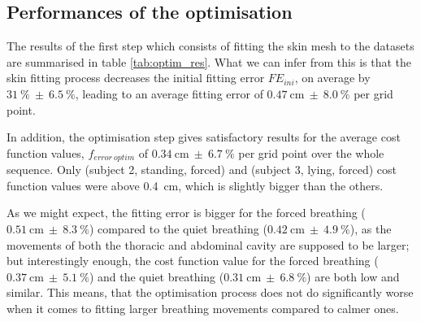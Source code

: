 \subsection{Performances of the optimisation}
The results of the first step which consists of fitting the skin mesh to the datasets are summarised in table \ref{tab:optim_res}. What we can infer from this is that the skin fitting process decreases the initial fitting error $FE_{ini}$, on average by $31~\%~\pm~6.5~\%$, leading to an average fitting error of $0.47~\mathrm{cm}~\pm~8.0~\%$ per grid point. 

In addition, the optimisation step gives satisfactory results for the average cost function values, $f_{error~optim}$ of $0.34~\mathrm{cm}~\pm~6.7~\%$ per grid point over the whole sequence. Only (subject 2, standing, forced) and (subject 3, lying, forced) cost function values were above 0.4~cm, which is slightly bigger than the others.
 
As we might expect, the fitting error is bigger for the forced breathing ($0.51~\mathrm{cm}~\pm~8.3~\%$) compared to the quiet breathing ($0.42~\mathrm{cm}~\pm~4.9~\%$), as the movements of both the thoracic and abdominal cavity are supposed to be larger; but interestingly enough, the cost function value for the forced breathing ($0.37~\mathrm{cm}~\pm~5.1~\%$) and the quiet breathing ($0.31~\mathrm{cm}~\pm~6.8~\%$) are both low and similar. This means, that the optimisation process does not do significantly worse when it comes to fitting larger breathing movements compared to calmer ones.

